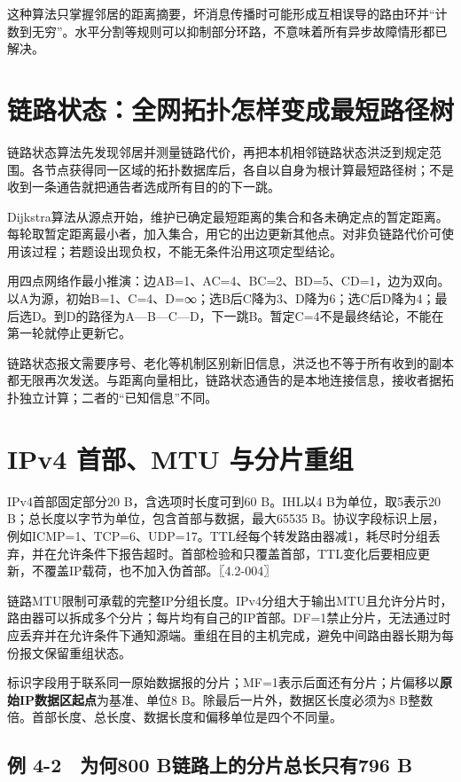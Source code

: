 这种算法只掌握邻居的距离摘要，坏消息传播时可能形成互相误导的路由环并``计数到无穷''。水平分割等规则可以抑制部分环路，不意味着所有异步故障情形都已解决。

\section{链路状态：全网拓扑怎样变成最短路径树}\label{cn-04-06}

链路状态算法先发现邻居并测量链路代价，再把本机相邻链路状态洪泛到规定范围。各节点获得同一区域的拓扑数据库后，各自以自身为根计算最短路径树；不是收到一条通告就把通告者选成所有目的的下一跳。

Dijkstra算法从源点开始，维护已确定最短距离的集合和各未确定点的暂定距离。每轮取暂定距离最小者，加入集合，用它的出边更新其他点。对非负链路代价可使用该过程；若题设出现负权，不能无条件沿用这项定型结论。

用四点网络作最小推演：边AB=1、AC=4、BC=2、BD=5、CD=1，边为双向。以A为源，初始B=1、C=4、D=∞；选B后C降为3、D降为6；选C后D降为4；最后选D。到D的路径为A---B---C---D，下一跳B。暂定C=4不是最终结论，不能在第一轮就停止更新它。

链路状态报文需要序号、老化等机制区别新旧信息，洪泛也不等于所有收到的副本都无限再次发送。与距离向量相比，链路状态通告的是本地连接信息，接收者据拓扑独立计算；二者的``已知信息''不同。

\section{IPv4 首部、MTU 与分片重组}\label{cn-04-07}

IPv4首部固定部分20 B，含选项时长度可到60 B。IHL以4 B为单位，取5表示20 B；总长度以字节为单位，包含首部与数据，最大65535 B。协议字段标识上层，例如ICMP=1、TCP=6、UDP=17。TTL经每个转发路由器减1，耗尽时分组丢弃，并在允许条件下报告超时。首部检验和只覆盖首部，TTL变化后要相应更新，不覆盖IP载荷，也不加入伪首部。〖4.2-004〗

链路MTU限制可承载的完整IP分组长度。IPv4分组大于输出MTU且允许分片时，路由器可以拆成多个分片；每片均有自己的IP首部。DF=1禁止分片，无法通过时应丢弃并在允许条件下通知源端。重组在目的主机完成，避免中间路由器长期为每份报文保留重组状态。

标识字段用于联系同一原始数据报的分片；MF=1表示后面还有分片；片偏移以\textbf{原始IP数据区起点}为基准、单位8 B。除最后一片外，数据区长度必须为8 B整数倍。首部长度、总长度、数据长度和偏移单位是四个不同量。

\subsection{例 4-2　为何800 B链路上的分片总长只有796 B}\label{cn-ex4-2}

